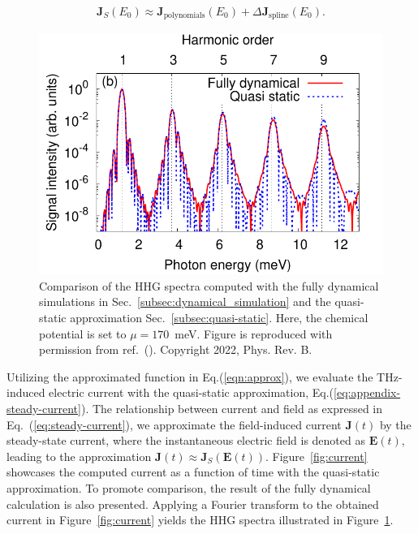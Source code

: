 \begin{align}
	\mathbf J_S(E_0)\approx \mathbf{J}_{\mathrm{polynomials }}(E_0)+\Delta \mathbf{J}_{\mathrm{spline}}(E_0).
	\label{eqn:approx}
\end{align}

\begin{figure}[htbp]
	\centering
	\includegraphics[width=0.8\linewidth]{pic/hhg_qstatic.pdf}
	\caption{\label{fig:hhg_qstatic}
		Comparison of the HHG spectra computed with the fully dynamical simulations in Sec.~\ref{subsec:dynamical_simulation} and the quasi-static approximation Sec.~\ref{subsec:quasi-static}. Here, the chemical potential is set to $\mu =170$~meV. Figure is reproduced with permission from ref.~(\cite{PhysRevB.106.024313}). Copyright 2022, Phys. Rev. B.}
\end{figure}

Utilizing the approximated function in Eq.(\ref{eqn:approx}), we evaluate the THz-induced electric
current with the quasi-static approximation, Eq.(\ref{eq:appendix-steady-current}).
The relationship between current and field as expressed in Eq.~(\ref{eq:steady-current}), we approximate the field-induced current $\mathbf J(t)$ by the steady-state current, where the instantaneous electric field is denoted as $\mathbf E(t)$, leading to the approximation $\mathbf J(t)\approx \mathbf J_S\left( \mathbf E(t) \right)$.
Figure~\ref{fig:current} showcases the computed current as a function of time with the quasi-static
approximation. To promote comparison, the result of the fully dynamical calculation is also
presented. Applying a Fourier transform to the obtained current in Figure~\ref{fig:current} yields
the \gls{HHG} spectra illustrated in Figure~\ref{fig:hhg_qstatic}.
